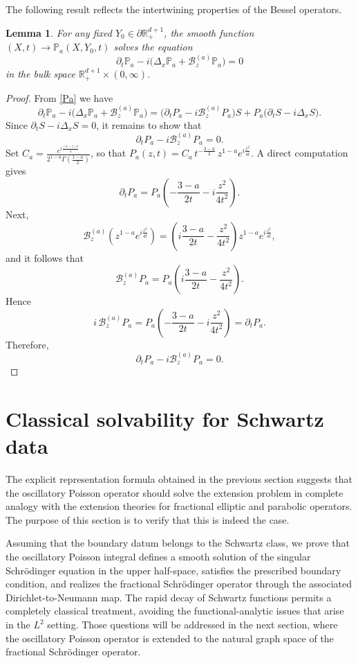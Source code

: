 \documentclass[11pt,letter]{amsart}
\def \RN {\mathbb{R}_+^{d+1}}
\newcommand{\p}{\partial}
\numberwithin{equation}{section}
\newtheorem{lemma}[theorem]{Lemma}
\numberwithin{equation}{section}
\begin{document}
The following result reflects the intertwining properties of the Bessel operators.

\begin{lemma}\label{L:Pa-solves-equation}
For any fixed $Y_0\in \p \RN$, the smooth function $(X,t)\to \mathbb P_a(X,Y_0,t)$ solves the equation 
\[
\partial_t \mathbb P_a - i\bigl(\Delta_x \mathbb P_a+\mathscr B_z^{(a)}\mathbb P_a\bigr)=0
\]
in the bulk space $\RN\times (0,\infty)$.
\end{lemma}

\begin{proof}
From \eqref{Pa} we have
\[
\partial_t \mathbb P_a - i\bigl(\Delta_x \mathbb P_a+\mathscr B_z^{(a)}\mathbb P_a\bigr)
=
\bigl(\partial_t P_a-i\mathscr B_z^{(a)}P_a\bigr)S
+
P_a \bigl(\partial_t S-i\Delta_x S\bigr).
\]
Since
$\partial_t S-i\Delta_x S=0$,
 it remains to show that
\[
\partial_t P_a-i\mathscr B_z^{(a)}P_a=0.
\]
Set $C_a=\frac{e^{i\frac{(a-1)\pi}{4}}}{2^{1-a}\Gamma\!\left(\frac{1-a}{2}\right)}$, so that
$P_a(z,t)=C_a\,t^{-\frac{3-a}{2}}\,z^{1-a}e^{i\frac{z^2}{4t}}$.
A direct computation gives
\[
\partial_t P_a
=
P_a\left(-\frac{3-a}{2t}-i\frac{z^2}{4t^2}\right).
\]
Next,
\[
\mathscr B_z^{(a)}\!\left(z^{1-a}e^{i\frac{z^2}{4t}}\right)
=
\left(i\frac{3-a}{2t}-\frac{z^2}{4t^2}\right)
z^{1-a}e^{i\frac{z^2}{4t}},
\]
and it follows that
\[
\mathscr B_z^{(a)}P_a
=
P_a\left(i\frac{3-a}{2t}-\frac{z^2}{4t^2}\right).
\]
Hence
\[
i\,\mathscr B_z^{(a)}P_a
=
P_a\left(-\frac{3-a}{2t}-i\frac{z^2}{4t^2}\right)
=
\partial_t P_a.
\]
Therefore,
\[
\partial_t P_a-i\mathscr B_z^{(a)}P_a=0.
\]


\end{proof}






\section{Classical solvability for Schwartz data}\label{S:schwartz}

The explicit representation formula obtained in the previous section
suggests that the oscillatory Poisson operator should solve the extension
problem in complete analogy with the  extension theories for
fractional elliptic and parabolic operators. The purpose of this section
is to verify that this is indeed the case.

Assuming that the boundary datum belongs to the Schwartz class, we prove
that the oscillatory Poisson integral defines a smooth solution of the
singular Schr\"odinger equation in the upper half-space, satisfies the
prescribed boundary condition, and realizes the fractional Schr\"odinger
operator through the associated Dirichlet-to-Neumann map. The rapid decay
of Schwartz functions permits a completely classical treatment, avoiding
the functional-analytic issues that arise in the $L^2$ setting. Those
questions will be addressed in the next section, where the oscillatory
Poisson operator is extended to the natural graph space of the fractional
Schr\"odinger operator.
\end{document}
